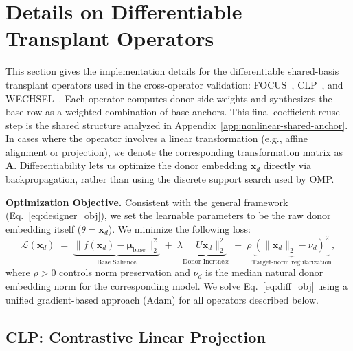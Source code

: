 

















\section{Details on Differentiable Transplant Operators}
\label{app:designers}

This section gives the implementation details for the differentiable shared-basis transplant operators used in the cross-operator validation: FOCUS~\citep{dobler2023focus}, CLP~\citep{ostendorff2023efficient}, and WECHSEL~\citep{minixhofer2021wechsel}.
Each operator computes donor-side weights and synthesizes the base row as a weighted combination of base anchors. This final coefficient-reuse step is the shared structure analyzed in Appendix~\ref{app:nonlinear-shared-anchor}.
In cases where the operator involves a linear transformation (e.g., affine alignment or projection), we denote the corresponding transformation matrix as $\mathbf{A}$.
Differentiability lets us optimize the donor embedding $\mathbf{x}_d$ directly via backpropagation, rather than using the discrete support search used by OMP.

\noindent\textbf{Optimization Objective.}
Consistent with the general framework (Eq.~\ref{eq:designer_obj}), we set the learnable parameters to be the raw donor embedding itself ($\theta = \mathbf{x}_d$). We minimize the following loss:
\begin{equation}
\label{eq:diff_obj}
    \mathcal{L}(\mathbf{x}_d)
    \;=\;
    \underbrace{\|f(\mathbf{x}_d) - \boldsymbol{\mu}_{\text{base}}\|_2^2}_{\text{Base Salience}}
    \;+\;
    \lambda \underbrace{\|U \mathbf{x}_d\|_2^2}_{\text{Donor Inertness}}
    \;+\;
    \rho \underbrace{(\|\mathbf{x}_d\|_2-\nu_d)^2}_{\text{Target-norm regularization}},
\end{equation}
where $\rho>0$ controls norm preservation and $\nu_d$ is the median natural donor embedding norm for the corresponding model.
We solve Eq.~\ref{eq:diff_obj} using a unified gradient-based approach (Adam) for all operators described below.
\subsection{CLP: Contrastive Linear Projection}
\label{sec:clp-breaker}

